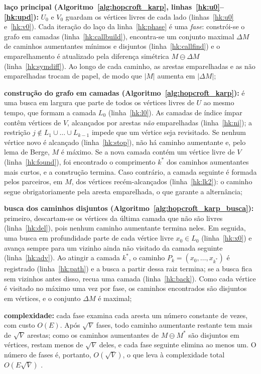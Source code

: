 \begin{alineas}
    \item \textbf{laço principal (Algoritmo~\ref{alg:hopcroft_karp}, linhas~\ref{hk:u0}--\ref{hk:upd}):} $U_0$ e $V_0$ guardam os vértices livres de cada lado (linhas~\ref{hk:u0} e~\ref{hk:v0}). Cada iteração do laço da linha~\ref{hk:phase} é uma \textit{fase}: constrói-se o grafo em camadas (linha~\ref{hk:callbuild}), encontra-se um conjunto maximal $\Delta M$ de caminhos aumentantes mínimos e disjuntos (linha~\ref{hk:callfind}) e o emparelhamento é atualizado pela diferença simétrica $M \ominus \Delta M$ (linha~\ref{hk:symdiff}). Ao longo de cada caminho, as arestas emparelhadas e as não emparelhadas trocam de papel, de modo que $|M|$ aumenta em $|\Delta M|$;
    \item \textbf{construção do grafo em camadas (Algoritmo~\ref{alg:hopcroft_karp}):} é uma busca em largura que parte de todos os vértices livres de $U$ ao mesmo tempo, que formam a camada $L_0$ (linha~\ref{hk:l0}). As camadas de índice ímpar contêm vértices de $V$, alcançados por arestas \textit{não} emparelhadas (linha~\ref{hk:ni}); a restrição $j \notin L_1 \cup \dots \cup L_{k-1}$ impede que um vértice seja revisitado. Se nenhum vértice novo é alcançado (linha~\ref{hk:stop}), não há caminho aumentante e, pelo lema de Berge, $M$ é máximo. Se a nova camada contém um vértice livre de $V$ (linha~\ref{hk:found}), foi encontrado o comprimento $k^*$ dos caminhos aumentantes mais curtos, e a construção termina. Caso contrário, a camada seguinte é formada pelos parceiros, em $M$, dos vértices recém-alcançados (linha~\ref{hk:lk2}): o caminho segue obrigatoriamente pela aresta emparelhada, o que garante a alternância;
    \item \textbf{busca dos caminhos disjuntos (Algoritmo~\ref{alg:hopcroft_karp_busca}):} primeiro, descartam-se os vértices da última camada que não são livres (linha~\ref{hk:del}), pois nenhum caminho aumentante termina neles. Em seguida, uma busca em profundidade parte de cada vértice livre $x_0 \in L_0$ (linha~\ref{hk:x0}) e avança sempre para um vizinho ainda não visitado da camada seguinte (linha~\ref{hk:adv}). Ao atingir a camada $k^*$, o caminho $P_k = (x_0, \dots, x_{k^*})$ é registrado (linha~\ref{hk:path}) e a busca a partir dessa raiz termina; se a busca fica sem vizinhos antes disso, recua uma camada (linha~\ref{hk:back}). Como cada vértice é visitado no máximo uma vez por fase, os caminhos encontrados são disjuntos em vértices, e o conjunto $\Delta M$ é maximal;
    \item \textbf{complexidade:} cada fase examina cada aresta um número constante de vezes, com custo $O(E)$. Após $\sqrt{V}$ fases, todo caminho aumentante restante tem mais de $\sqrt{V}$ arestas; como os caminhos aumentantes de $M \ominus M^*$ são disjuntos em vértices, restam menos de $\sqrt{V}$ deles, e cada fase seguinte elimina ao menos um. O número de fases é, portanto, $O(\sqrt{V})$, o que leva à complexidade total $O(E\sqrt{V})$ \cite{burkard}.
\end{alineas}

